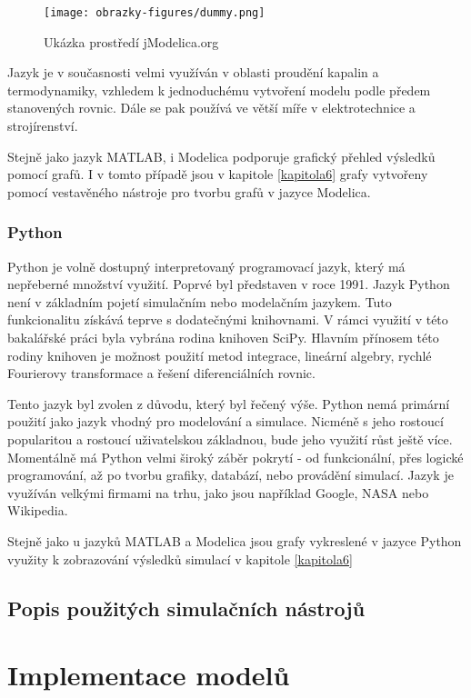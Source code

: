 \begin{figure}
    \centering
    \texttt{[image: obrazky-figures/dummy.png]}
    \caption{Ukázka prostředí jModelica.org}
    \label{fig:modelica}
\end{figure}

Jazyk je v současnosti velmi využíván v oblasti proudění kapalin a termodynamiky, vzhledem k jednoduchému vytvoření modelu podle předem stanovených rovnic. Dále se pak používá ve větší míře v elektrotechnice a strojírenství.

Stejně jako jazyk MATLAB, i Modelica podporuje grafický přehled výsledků pomocí grafů. I v tomto případě jsou v kapitole \ref{kapitola6} grafy vytvořeny pomocí vestavěného nástroje pro tvorbu grafů v jazyce Modelica.


\subsection{Python}
Python je volně dostupný interpretovaný programovací jazyk, který má nepřeberné množství využití. Poprvé byl představen v roce 1991. Jazyk Python není v základním pojetí simulačním nebo modelačním jazykem. Tuto funkcionalitu získává teprve s dodatečnými knihovnami. V rámci využití v této bakalářské práci byla vybrána rodina knihoven SciPy. Hlavním přínosem této rodiny knihoven je možnost použití metod integrace, lineární algebry, rychlé Fourierovy transformace a řešení diferenciálních rovnic.

Tento jazyk byl zvolen z důvodu, který byl řečený výše. Python nemá primární použití jako jazyk vhodný pro modelování a simulace. Nicméně s jeho rostoucí popularitou a rostoucí uživatelskou základnou, bude jeho využití růst ještě více. Momentálně má Python velmi široký záběr pokrytí - od funkcionální, přes logické programování, až po tvorbu grafiky, databází, nebo provádění simulací. Jazyk je využíván velkými firmami na trhu, jako jsou například Google, NASA nebo Wikipedia.

Stejně jako u jazyků MATLAB a Modelica jsou grafy vykreslené v jazyce Python využity k zobrazování výsledků simulací v kapitole \ref{kapitola6}

\section{Popis použitých simulačních nástrojů}


\chapter{Implementace modelů}
\label{kapitola4}

